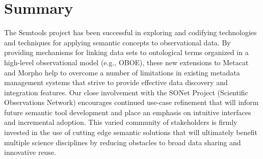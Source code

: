 \section{Summary}
\label{sec:summary}

The Semtools project has been successful in exploring and codifying
technologies and techniques for applying semantic concepts to
observational data. By providing mechanisms for linking data sets to
ontological terms organized in a high-level observational model (e.g.,
OBOE), these new extensions to Metacat and Morpho help to overcome a
number of limitations in existing metadata management systems that
strive to provide effective data discovery and integration
features. Our close involvement with the SONet Project (Scientific
Observations Network) \cite{sonet} encourages continued use-case
refinement that will inform future semantic tool development and place
an emphasis on intuitive interfaces and incremental adoption. This
varied community of stakeholders is firmly invested in the use of
cutting edge semantic solutions that will ultimately benefit multiple
science disciplines by reducing obstacles to broad data sharing and
innovative reuse.


